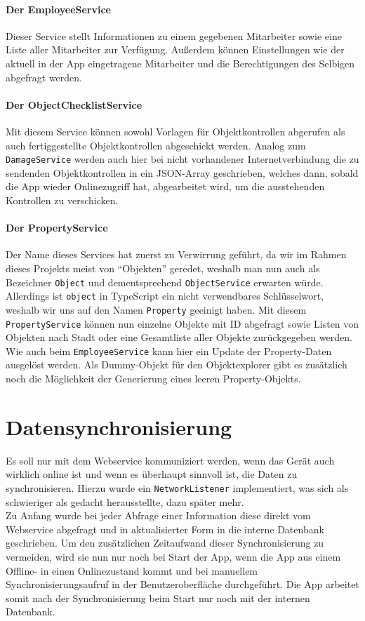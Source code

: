 \documentclass[12pt]{article}
\begin{document}
\paragraph{Der EmployeeService} Dieser Service stellt Informationen zu einem gegebenen Mitarbeiter sowie eine Liste aller Mitarbeiter zur Verfügung. Außerdem können Einstellungen wie der aktuell in der App eingetragene Mitarbeiter und die Berechtigungen des Selbigen abgefragt werden.
\paragraph{Der ObjectChecklistService} Mit diesem Service können sowohl Vorlagen für Objektkontrollen abgerufen als auch fertiggestellte Objektkontrollen abgeschickt werden. Analog zum \texttt{DamageService} werden auch hier bei nicht vorhandener Internetverbindung die zu sendenden Objektkontrollen in ein JSON-Array geschrieben, welches dann, sobald die App wieder Onlinezugriff hat, abgearbeitet wird, um die ausstehenden Kontrollen zu verschicken.
\paragraph{Der PropertyService} Der Name dieses Services hat zuerst zu Verwirrung geführt, da wir im Rahmen dieses Projekts meist von ``Objekten'' geredet, weshalb man nun auch als Bezeichner \texttt{Object} und dementsprechend \texttt{ObjectService} erwarten würde. Allerdings ist \texttt{object} in TypeScript ein nicht verwendbares Schlüsselwort, weshalb wir uns auf den Namen \texttt{Property} geeinigt haben. Mit diesem \texttt{PropertyService} können nun einzelne Objekte mit ID abgefragt sowie Listen von Objekten nach Stadt oder eine Gesamtliste aller Objekte zurückgegeben werden. Wie auch beim \texttt{EmployeeService} kann hier ein Update der Property-Daten ausgelöst werden. Als Dummy-Objekt für den Objektexplorer gibt es zusätzlich noch die Möglichkeit der Generierung eines leeren Property-Objekts.

\section{Datensynchronisierung}
Es soll nur mit dem Webservice kommuniziert werden, wenn das Gerät auch wirklich online ist und wenn es überhaupt sinnvoll ist, die Daten zu synchronisieren. Hierzu wurde ein \texttt{NetworkListener} implementiert, was sich als schwieriger als gedacht herausstellte, dazu später mehr.\\
Zu Anfang wurde bei jeder Abfrage einer Information diese direkt vom Webservice abgefragt und in aktualisierter Form in die interne Datenbank geschrieben. Um den zusätzlichen Zeitaufwand dieser Synchronisierung zu vermeiden, wird sie nun nur noch bei Start der App, wenn die App aus einem Offline- in einen Onlinezustand kommt und bei manuellem Synchronisierungsaufruf in der Benutzeroberfläche durchgeführt. Die App arbeitet somit nach der Synchronisierung beim Start nur noch mit der internen Datenbank.
\end{document}
